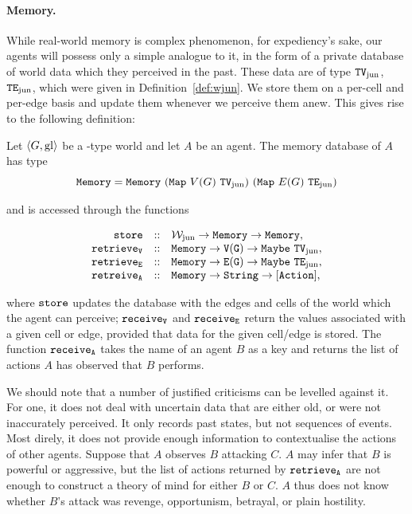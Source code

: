 \paragraph{Memory.} While real-world memory is complex phenomenon, for expediency's sake, our agents will possess only a simple analogue to it, in the form of a private database of world data which they perceived in the past. These data are of type $\mathtt{TV_{\mathrm{jun}}}$, $\mathtt{TE_{\mathrm{jun}}}$, which were given in Definition~\ref{def:wjun}. We store them on a per-cell and per-edge basis and update them whenever we perceive them anew. This gives rise to the following definition:


\begin{definition}
	Let $\langle G,\mathrm{gl} \rangle$ be a \wjun-type world and let $A$ be an agent. The memory database of $A$ has type
	$$
		\type{Memory} = \field{Memory}\ \type{(Map\ \mathnormal{V(G)}\ TV_{\mathrm{jun}})\ (Map\ \mathnormal{E(G)}\ TE_{\mathrm{jun}})}
	$$
	
	and is accessed through the functions
	
	$$
		\begin{array}{r c l}
			\mathtt{store} & :: & \mathtt{\mathcal{W}_{\mathrm{jun}} \rightarrow Memory \rightarrow Memory},\\
			\mathtt{retrieve_V} & :: & \mathtt{Memory \rightarrow V(G) \rightarrow Maybe\ TV_{\mathrm{jun}}},\\
			\mathtt{retrieve_E} & :: & \mathtt{Memory \rightarrow E(G) \rightarrow Maybe\ TE_{\mathrm{jun}}},\\
			\mathtt{retreive_A} & :: & \mathtt{Memory \rightarrow String \rightarrow [Action]},
		\end{array}
	$$
	
	where $\mathtt{store}$ updates the database with the edges and cells of the world which the agent can perceive; $\mathtt{receive_V}$ and $\mathtt{receive_E}$ return the values associated with a given cell or edge, provided that data for the given cell/edge is stored. The function $\mathtt{receive_A}$ takes the name of an agent $B$ as a key and returns the list of actions $A$ has observed that $B$ performs.
\end{definition}

We should note that a number of justified criticisms can be levelled against it. For one, it does not deal with uncertain data that are either old, or were not inaccurately perceived. It only records past states, but not sequences of events. Most direly, it does not provide enough information to contextualise the actions of other agents. Suppose that $A$ observes $B$ attacking $C$. $A$ may infer that $B$ is powerful or aggressive, but the list of actions returned by $\mathtt{retrieve_A}$ are not enough to construct a theory of mind for either $B$ or $C$. $A$ thus does not know whether $B$'s attack was revenge, opportunism, betrayal, or plain hostility.

